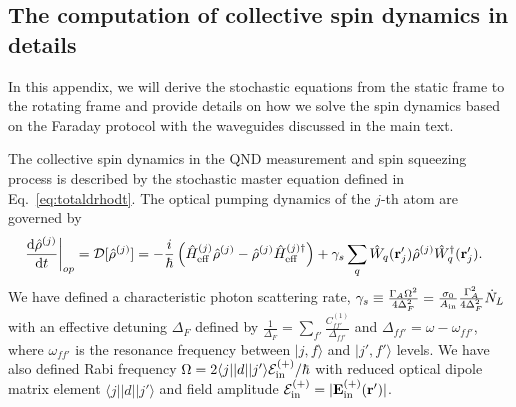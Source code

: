 \documentclass[preprint,aps,pra,onecolumn,superscriptaddress]{revtex4-1} %
\newcommand{\dt}[1]{\frac{{\mathrm d} {#1}}{{\mathrm d}t}}
\def\br{\mathbf{r}}
\def\bra#1{\langle{#1}\rvert}%
\def\ket#1{\lvert{#1}\rangle}%
\begin{document}


\begin{appendix}
\section{The computation of collective spin dynamics in details}\label{Sec::opticalpumpinginrotatingframe}
In this appendix, we will derive the stochastic equations from the static frame to the rotating frame and provide details on how we solve the spin dynamics based on the Faraday protocol with the waveguides discussed in the main text. 

The collective spin dynamics in the QND measurement and spin squeezing process is described by the stochastic master equation defined in Eq.~\eqref{eq:totaldrhodt}. The optical pumping dynamics of the $ j $-th atom are governed by 
\begin{align}\label{eq:op_master}
\left.\dt{\hat{\rho}^{(j)}}\right|_{op} &= \mathcal{D}[\hat{\rho}^{(j)}]=-\frac{i}{\hbar}\left(\hat{H}_{\rm eff}^{(j)}\hat{\rho}^{(j)} -\hat{\rho}^{(j)}\hat{H}_{\rm eff}^{(j)\dagger} \right) + \gamma_s\sum_{q}\hat{W}_q(\br'_j)\hat{\rho}^{(j)}\hat{W}_q^\dagger(\br'_j). %
\end{align} 
We have defined a characteristic photon scattering rate, $\gamma_s \equiv \frac{\Gamma_A\Omega^2}{4\Delta_{F}^2}= \frac{\sigma_0}{A_{\rm in}}\frac{\Gamma_A^2}{4 \Delta_{F}^2} \dot{N}_L $ with an effective detuning $ \Delta_F $ defined by $ \frac{1}{\Delta_F}=\sum_{f'}\frac{C_{ff'}^{(1)}}{\Delta_{ff'}} $ and $ \Delta_{ff'}=\omega-\omega_{ff'} $, where $ \omega_{ff'} $ is the resonance frequency between $ \ket{j,f} $ and $ \ket{j',f'} $ levels.
We have also defined Rabi frequency $ \Omega=2\bra{j}|d|\ket{j'}\mathcal{E}^{(+)}_{\rm in}/\hbar $ with reduced optical dipole matrix element $\bra{j}|d|\ket{j'}$ and field amplitude $ \mathcal{E}^{(+)}_{\rm in}=|\mathbf{E}_{\rm in}^{(+)}(\br')| $.

\end{appendix}
\end{document}
